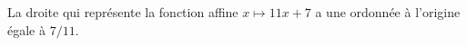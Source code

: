 La droite qui représente la fonction affine $x\mapsto 11x+7$ a une ordonnée à l'origine égale à $7/11$.

\begin{reponses}
\end{reponses}

\begin{comment}

\end{comment}

